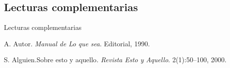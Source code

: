 \documentclass[]{beamer}
\theoremstyle{plain}
\begin{document}
\subsection*{Lecturas complementarias}
\begin{frame}[allowframebreaks]{Lecturas complementarias}


\beamertemplatebookbibitems
\begin{thebibliography}{1}
A. Autor. \newblock\emph{Manual de Lo que sea}.\newblock
Editorial, 1990.\beamertemplatearticlebibitems

S. Alguien.\newblock Sobre esto y aquello\emph{.}
\newblock\emph{Revista Esto y Aquello}. 2(1):50--100, 2000.\end{thebibliography}
\end{frame}
\end{document}
